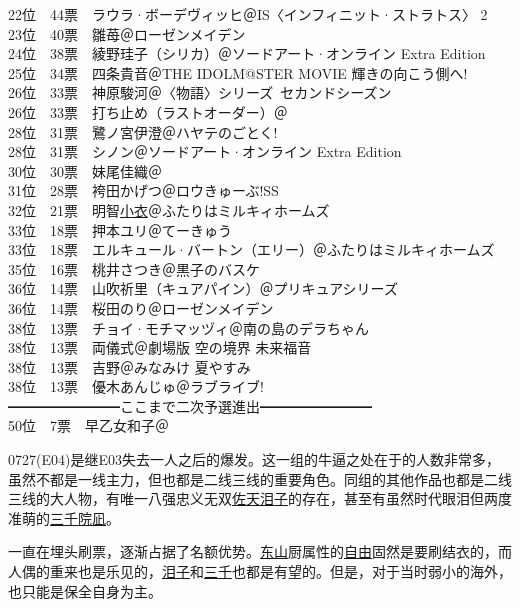 {    22位　44票　ラウラ·ボーデヴィッヒ＠IS〈インフィニット·ストラトス〉 2\\
    23位　40票　雛苺＠ローゼンメイデン\\
    24位　38票　綾野珪子（シリカ）＠ソードアート·オンライン Extra Edition\\
    25位　34票　四条貴音＠THE IDOLM@STER MOVIE 輝きの向こう側へ!\\
    26位　33票　神原駿河＠〈物語〉シリーズ~セカンドシーズン\\
    26位　33票　打ち止め（ラストオーダー）＠\Railgan\\
    28位　31票　鷺ノ宮伊澄＠ハヤテのごとく!\\
    28位　31票　シノン＠ソードアート·オンライン Extra Edition\\
    30位　30票　妹尾佳織＠\Saki\\
    31位　28票　袴田かげつ＠ロウきゅーぶ!SS\\
    32位　21票　明智\uline{小衣}＠ふたりはミルキィホームズ\\
    33位　18票　押本ユリ＠てーきゅう\\
    33位　18票　エルキュール·バートン（エリー）＠ふたりはミルキィホームズ\\
    35位　16票　桃井さつき＠黒子のバスケ\\
    36位　14票　山吹祈里（キュアパイン）＠プリキュアシリーズ\\
    36位　14票　桜田のり＠ローゼンメイデン\\
    38位　13票　チョイ·モチマッヅィ＠南の島のデラちゃん\\
    38位　13票　両儀式＠劇場版 空の境界 未来福音\\
    38位　13票　吉野＠みなみけ 夏やすみ\\
    38位　13票　優木あんじゅ＠ラブライブ!\\
    ━━━━━━━━ここまで二次予選進出━━━━━━━━\\
    50位　7票　早乙女和子＠\Madomagi
}

0727(E04)是继E03失去一人之后的爆发。这一组的牛逼之处在于的人数非常多，虽然不都是一线主力，但也都是二线三线的重要角色。同组的其他作品也都是二线三线的大人物，有唯一八强忠义无双\uline{佐天泪子}的存在，甚至有虽然时代眼泪但两度准萌的\uline{\uline{三千院凪}}。

一直在埋头刷票，逐渐占据了名额优势。\uline{东山}厨属性的\uline{自由}固然是要刷结衣的，而人偶的重来也是乐见的，\uline{泪子}和\uline{三千}也都是有望的。但是，对于当时弱小的海外，也只能是保全自身为主。

